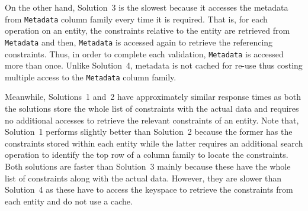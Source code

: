 On the other hand,  Solution~3 is the slowest  because  it accesses the metadata
 from \texttt{Metadata} column family every time it is required.
That is, for each operation on an entity, the constraints relative to the entity
are retrieved from \texttt{Metadata} and then,  \texttt{Metadata} is accessed
again 
to retrieve the referencing constraints.
Thus,  in order to complete each validation,  \texttt{Metadata} is accessed more
than once.
Unlike Solution~4,  metadata is not cached for re-use thus costing multiple
access to the \texttt{Metadata} column family.

Meanwhile,  Solutions~1 and~2 have approximately similar response times as both
the solutions store the whole list of constraints with the actual data and
requires no additional accesses to retrieve the relevant constraints of an
entity.  Note that, Solution~1 performs slightly better than Solution~2 because
the former has the  constraints  stored within each entity while the latter
requires an additional search operation to identify the top row of a column
family to locate the  constraints.  Both solutions are faster than Solution~3
mainly because these have the whole list of constraints along with the actual
data.  However,  they are slower than Solution~4 as these have to access the
keyspace to retrieve the constraints from each entity and do not use a
cache.


